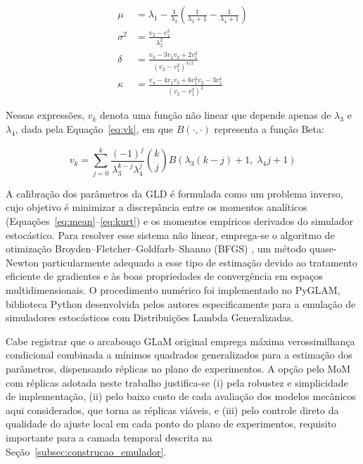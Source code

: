 \begin{align}
\mu &= \lambda_1 - \frac{1}{\lambda_2} \left( \frac{1}{\lambda_3 + 1} - \frac{1}{\lambda_4 + 1} \right) \label{eq:mean} \\
\sigma^2 &= \frac{v_2 - v_1^2}{\lambda_2^2} \label{eq:variance_gld} \\
\delta &= \frac{v_3 - 3v_1v_2 + 2v_1^3}{(v_2 - v_1^2)^{3/2}} \label{eq:skew} \\
\kappa &= \frac{v_4 - 4v_1v_3 + 6v_1^2v_2 - 3v_1^4}{(v_2 - v_1^2)^2} \label{eq:kurt}
\end{align}

Nessas expressões, $v_k$ denota uma função não linear que depende apenas de $\lambda_3$ e $\lambda_4$, dada pela Equação~\eqref{eq:vk}, em que $B(\cdot, \cdot)$ representa a função Beta:

\begin{equation}
v_k = \sum_{j=0}^{k} \frac{(-1)^j}{\lambda_3^{k-j} \lambda_4^j} \binom{k}{j} B\!\left(\lambda_3(k-j) + 1,\; \lambda_4 j + 1\right) \label{eq:vk}
\end{equation}

A calibração dos parâmetros da GLD é formulada como um problema inverso, cujo objetivo é minimizar a discrepância entre os momentos analíticos (Equações~\ref{eq:mean}--\ref{eq:kurt}) e os momentos empíricos derivados do simulador estocástico. Para resolver esse sistema não linear, emprega-se o algoritmo de otimização Broyden--Fletcher--Goldfarb--Shanno (BFGS) \parencite{nocedal2006}, um método quase-Newton particularmente adequado a esse tipo de estimação devido ao tratamento eficiente de gradientes e às boas propriedades de convergência em espaços multidimensionais. O procedimento numérico foi implementado no PyGLAM, biblioteca Python desenvolvida pelos autores especificamente para a emulação de simuladores estocásticos com Distribuições Lambda Generalizadas.

Cabe registrar que o arcabouço GLaM original \parencite{ZhuSudret2021} emprega máxima verossimilhança condicional combinada a mínimos quadrados generalizados para a estimação dos parâmetros, dispensando réplicas no plano de experimentos. A opção pelo MoM com réplicas adotada neste trabalho justifica-se (i) pela robustez e simplicidade de implementação, (ii) pelo baixo custo de cada avaliação dos modelos mecânicos aqui considerados, que torna as réplicas viáveis, e (iii) pelo controle direto da qualidade do ajuste local em cada ponto do plano de experimentos, requisito importante para a camada temporal descrita na Seção~\ref{subsec:construcao_emulador}.


